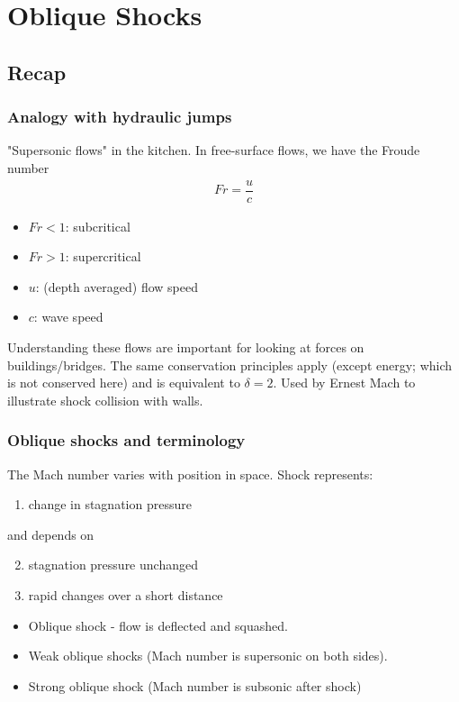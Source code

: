 \chapter{Oblique Shocks}
\section{Recap}
\subsection{Analogy with hydraulic jumps}
"Supersonic flows" in the kitchen. In free-surface flows, we have the Froude number
\begin{gather}
    Fr = \dfrac{u}{c}
\end{gather}
\begin{itemize}[noitemsep]
    \item $Fr < 1$: subcritical
    \item $Fr > 1$: supercritical
    \item $u$: (depth averaged) flow speed
    \item $c$: wave speed
\end{itemize}
Understanding these flows are important for looking at forces on buildings/bridges. The same conservation principles apply (except energy; which is not conserved here) and is equivalent to $\delta = 2$. Used by Ernest Mach to illustrate shock collision with walls.
\subsection{Oblique shocks and terminology}
The Mach number varies with position in space. Shock represents:
\begin{enumerate}
    \item change in stagnation pressure
\end{enumerate}
and depends on
\begin{enumerate}
    \setcounter{enumi}{1}
    \item stagnation pressure unchanged
    \item rapid changes over a short distance
\end{enumerate}
\begin{itemize}[noitemsep]
    \item Oblique shock - flow is deflected and squashed.
    \item Weak oblique shocks (Mach number is supersonic on both sides).
    \item Strong oblique shock (Mach number is subsonic after shock)
\end{itemize}
